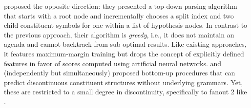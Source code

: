 \documentclass[../document.tex]{subfiles}
\begin{document}
     proposed the opposite direction: they presented a top-down parsing algorithm that starts with a root node and incrementally chooses a split index and two child constituent symbols for one within a list of hypothesis nodes.
    In contrast to the previous approach, their algorithm is \emph{greedy}, i.e., it does not maintain an agenda and cannot backtrack from sub-optimal results.
    Like existing approaches, it features maximum-margin training but drops the concept of explicitly defined features in favor of scores computed using artificial neural networks.
     and \citet{StaSte20} (independently but simultaneously) proposed bottom-up procedures that can predict discontinuous constituent structures without underlying grammars.
    Yet, these are restricted to a small degree in discontinuity, specifically to fanout 2 like .
\end{document}
